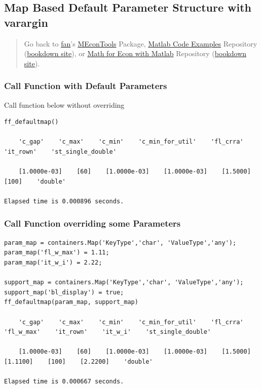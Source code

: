 \documentclass[
]{book}
\begin{document}
\hypertarget{map-based-default-parameter-structure-with-varargin}{%
\subsection{Map Based Default Parameter Structure with varargin}\label{map-based-default-parameter-structure-with-varargin}}

\begin{quote}
Go back to \href{http://fanwangecon.github.io/}{fan}'s \href{https://fanwangecon.github.io/MEconTools/}{MEconTools} Package, \href{https://fanwangecon.github.io/M4Econ/}{Matlab Code Examples} Repository (\href{https://fanwangecon.github.io/M4Econ/bookdown}{bookdown site}), or \href{https://fanwangecon.github.io/Math4Econ/}{Math for Econ with Matlab} Repository (\href{https://fanwangecon.github.io/Math4Econ/bookdown}{bookdown site}).
\end{quote}

\hypertarget{call-function-with-default-parameters}{%
\subsubsection{Call Function with Default Parameters}\label{call-function-with-default-parameters}}

Call function below without overriding

\begin{verbatim}
ff_defaultmap()

    'c_gap'    'c_max'    'c_min'    'c_min_for_util'    'fl_crra'    'it_rown'    'st_single_double'

    [1.0000e-03]    [60]    [1.0000e-03]    [1.0000e-03]    [1.5000]    [100]    'double'

Elapsed time is 0.000896 seconds.
\end{verbatim}

\hypertarget{call-function-overriding-some-parameters}{%
\subsubsection{Call Function overriding some Parameters}\label{call-function-overriding-some-parameters}}

\begin{verbatim}
param_map = containers.Map('KeyType','char', 'ValueType','any');
param_map('fl_w_max') = 1.11;
param_map('it_w_i') = 2.22;

support_map = containers.Map('KeyType','char', 'ValueType','any');
support_map('bl_display') = true;
ff_defaultmap(param_map, support_map)

    'c_gap'    'c_max'    'c_min'    'c_min_for_util'    'fl_crra'    'fl_w_max'    'it_rown'    'it_w_i'    'st_single_double'

    [1.0000e-03]    [60]    [1.0000e-03]    [1.0000e-03]    [1.5000]    [1.1100]    [100]    [2.2200]    'double'

Elapsed time is 0.000667 seconds.
\end{verbatim}
\end{document}
